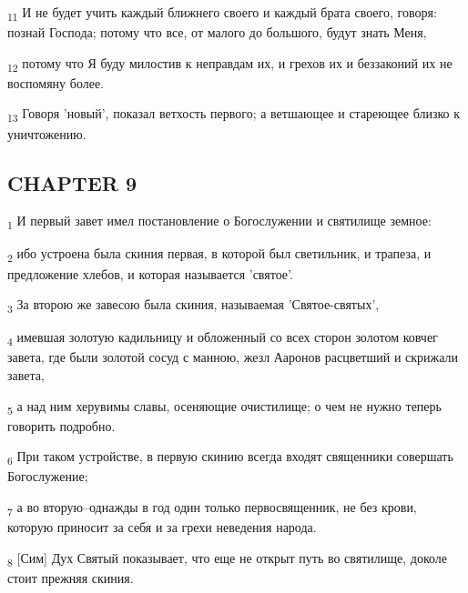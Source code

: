\begin{tcolorbox}
\textsubscript{11} И не будет учить каждый ближнего своего и каждый брата своего, говоря: познай Господа; потому что все, от малого до большого, будут знать Меня,
\end{tcolorbox}
\begin{tcolorbox}
\textsubscript{12} потому что Я буду милостив к неправдам их, и грехов их и беззаконий их не воспомяну более.
\end{tcolorbox}
\begin{tcolorbox}
\textsubscript{13} Говоря 'новый', показал ветхость первого; а ветшающее и стареющее близко к уничтожению.
\end{tcolorbox}
\subsection{CHAPTER 9}
\begin{tcolorbox}
\textsubscript{1} И первый завет имел постановление о Богослужении и святилище земное:
\end{tcolorbox}
\begin{tcolorbox}
\textsubscript{2} ибо устроена была скиния первая, в которой был светильник, и трапеза, и предложение хлебов, и которая называется 'святое'.
\end{tcolorbox}
\begin{tcolorbox}
\textsubscript{3} За второю же завесою была скиния, называемая 'Святое-святых',
\end{tcolorbox}
\begin{tcolorbox}
\textsubscript{4} имевшая золотую кадильницу и обложенный со всех сторон золотом ковчег завета, где были золотой сосуд с манною, жезл Ааронов расцветший и скрижали завета,
\end{tcolorbox}
\begin{tcolorbox}
\textsubscript{5} а над ним херувимы славы, осеняющие очистилище; о чем не нужно теперь говорить подробно.
\end{tcolorbox}
\begin{tcolorbox}
\textsubscript{6} При таком устройстве, в первую скинию всегда входят священники совершать Богослужение;
\end{tcolorbox}
\begin{tcolorbox}
\textsubscript{7} а во вторую--однажды в год один только первосвященник, не без крови, которую приносит за себя и за грехи неведения народа.
\end{tcolorbox}
\begin{tcolorbox}
\textsubscript{8} [Сим] Дух Святый показывает, что еще не открыт путь во святилище, доколе стоит прежняя скиния.
\end{tcolorbox}

